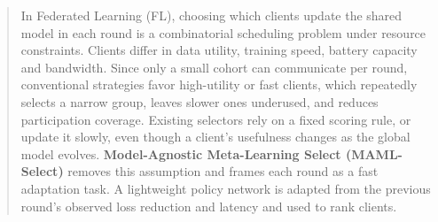 \documentclass[journal]{IEEEtran}
\theoremstyle{remark}
\newcommand{\revision}[1]{#1}
\begin{document}
\begin{abstract}
\revision{In Federated Learning (FL), choosing which clients update the shared model in each round is a combinatorial scheduling problem under resource constraints. Clients differ in data utility, training speed, battery capacity and bandwidth. Since only a small cohort can communicate per round, conventional strategies favor high-utility or fast clients, which repeatedly selects a narrow group, leaves slower ones underused, and reduces participation coverage. Existing selectors rely on a fixed scoring rule, or update it slowly, even though a client’s usefulness changes as the global model evolves. \textbf{Model-Agnostic Meta-Learning Select (MAML-Select)} removes this assumption and frames each round as a fast adaptation task. A lightweight policy network is adapted from the previous round’s observed loss reduction and latency and used to rank clients. %
}
\end{abstract}
\end{document}
